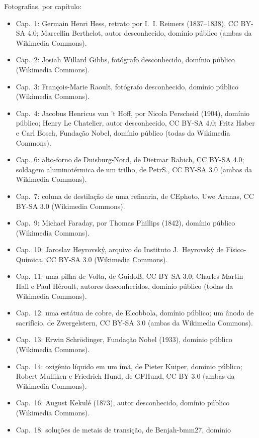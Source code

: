 \bigskip
\noindent Fotografias, por capítulo:
\begin{itemize}\small
  \item Cap.~1: Germain Henri Hess, retrato por I.~I. Reimers (1837--1838),
        CC BY-SA 4.0; Marcellin Berthelot, autor desconhecido, domínio público
        (ambas da Wikimedia Commons).
  \item Cap.~2: Josiah Willard Gibbs, fotógrafo desconhecido, domínio público
        (Wikimedia Commons).
  \item Cap.~3: François-Marie Raoult, fotógrafo desconhecido, domínio público
        (Wikimedia Commons).
  \item Cap.~4: Jacobus Henricus van 't Hoff, por Nicola Perscheid (1904),
        domínio público; Henry Le Chatelier, autor desconhecido, CC BY-SA 4.0;
        Fritz Haber e Carl Bosch, Fundação Nobel, domínio público (todas da
        Wikimedia Commons).
  \item Cap.~6: alto-forno de Duisburg-Nord, de Dietmar Rabich, CC BY-SA
        4.0; soldagem aluminotérmica de um trilho, de PetrS., CC BY-SA 3.0
        (ambas da Wikimedia Commons).
  \item Cap.~7: coluna de destilação de uma refinaria, de CEphoto, Uwe Aranas,
        CC BY-SA 3.0 (Wikimedia Commons).
  \item Cap.~9: Michael Faraday, por Thomas Phillips (1842), domínio público
        (Wikimedia Commons).
  \item Cap.~10: Jaroslav Heyrovsk\'y, arquivo do Instituto J.~Heyrovsk\'y
        de Físico-Química, CC BY-SA 3.0 (Wikimedia Commons).
  \item Cap.~11: uma pilha de Volta, de GuidoB, CC BY-SA 3.0; Charles Martin Hall
        e Paul H\'eroult, autores desconhecidos, domínio público (todas da
        Wikimedia Commons).
  \item Cap.~12: uma estátua de cobre, de Elcobbola, domínio público; um ânodo
        de sacrifício, de Zwergelstern, CC BY-SA 3.0 (ambas da Wikimedia Commons).
  \item Cap.~13: Erwin Schr\"odinger, Fundação Nobel (1933), domínio público
        (Wikimedia Commons).
  \item Cap.~14: oxigênio líquido em um ímã, de Pieter Kuiper, domínio público;
        Robert Mulliken e Friedrich Hund, de GFHund, CC BY 3.0 (ambas da
        Wikimedia Commons).
  \item Cap.~16: August Kekul\'e (1873), autor desconhecido, domínio público
        (Wikimedia Commons).
  \item Cap.~18: soluções de metais de transição, de Benjah-bmm27, domínio

\end{itemize}
